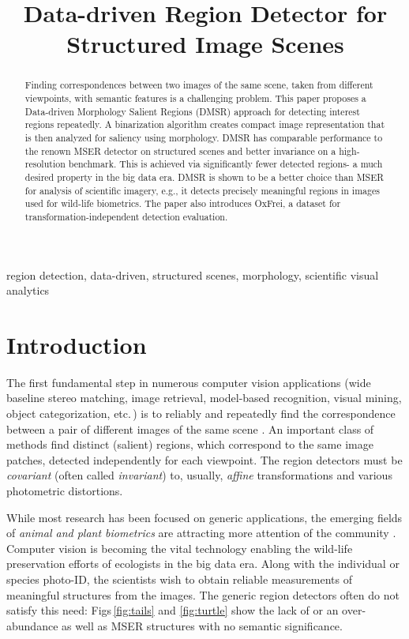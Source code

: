 \documentclass{article}
\title{Data-driven Region Detector for Structured Image Scenes}
\begin{document}
\maketitle

\begin{abstract}
Finding correspondences between two images of the same scene, taken from different viewpoints, with semantic features is a challenging problem.
This paper proposes a Data-driven Morphology Salient Regions (DMSR) approach for detecting interest regions repeatedly. 
A binarization algorithm creates compact image representation that is then analyzed for saliency using morphology.
DMSR has comparable performance to the renown MSER detector on structured scenes and better invariance on a high-resolution benchmark. 
This is achieved via significantly fewer detected regions- a much desired property in the big data era. 
DMSR is shown to be a better choice than MSER for analysis of scientific imagery, e.g.,
it detects precisely meaningful regions in images used for wild-life biometrics.
The paper also introduces OxFrei, a dataset for transformation-independent detection evaluation.
\end{abstract}

\begin{keywords}
region detection, data-driven, structured scenes, morphology, scientific visual analytics
\end{keywords}

\section{Introduction}
\label{sec:intro}
The first fundamental step in numerous computer vision applications (wide baseline stereo matching, image retrieval, model-based recognition, visual mining, object categorization, etc.\,) is to reliably and repeatedly find  the correspondence between a pair of different images of the same scene \cite{Matas2002BMVC, Rodriguez2013, EscaleraCVPR07}. An important class of methods find distinct (salient) regions, which correspond to the same image patches, detected independently for each viewpoint. The region detectors must be {\em covariant} (often called {\em invariant}) to, usually, {\em affine} transformations and various photometric distortions. 

While most research has been focused on generic applications, the emerging fields of {\em animal and plant biometrics} are attracting more attention of the community \cite{Kuehl2013, leafsnap_eccv2012}. Computer vision is becoming the vital technology enabling the wild-life preservation efforts of ecologists in the big data era. Along with the individual or species photo-ID, the scientists wish to obtain reliable measurements of meaningful structures from the images. The generic region detectors often do not satisfy this need: Figs\,\ref{fig:tails} and \ref{fig:turtle} show the lack of or an over-abundance as well as MSER structures with no semantic significance.
\end{document}
